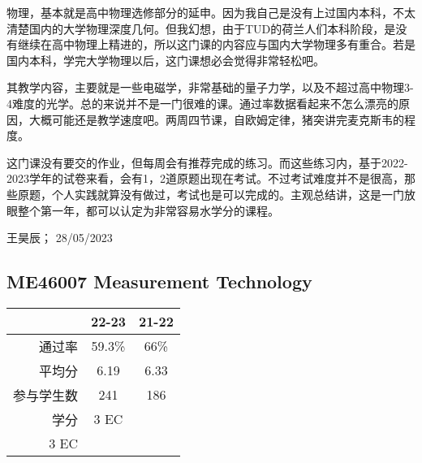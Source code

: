 物理，基本就是高中物理选修部分的延申。因为我自己是没有上过国内本科，不太清楚国内的大学物理深度几何。但我幻想，由于TUD的荷兰人们本科阶段，是没有继续在高中物理上精进的，所以这门课的内容应与国内大学物理多有重合。若是国内本科，学完大学物理以后，这门课想必会觉得非常轻松吧。

其教学内容，主要就是一些电磁学，非常基础的量子力学，以及不超过高中物理3-4难度的光学。总的来说并不是一门很难的课。通过率数据看起来不怎么漂亮的原因，大概可能还是教学速度吧。两周四节课，自欧姆定律，猪突讲完麦克斯韦的程度。

这门课没有要交的作业，但每周会有推荐完成的练习。而这些练习内，基于2022-2023学年的试卷来看，会有1，2道原题出现在考试。不过考试难度并不是很高，那些原题，个人实践就算没有做过，考试也是可以完成的。主观总结讲，这是一门放眼整个第一年，都可以认定为非常容易水学分的课程。
\begin{flushright}
王昊辰； 28/05/2023
\end{flushright}


\subsection{ME46007 Measurement Technology}
\begin{minipage}{0.45\textwidth}
\centering
{}
\end{minipage}%
\begin{minipage}{0.45\textwidth}
\raggedleft
\begin{tabular}{r|c|c}
\textbf{ } & \textbf{22-23} & \textbf{21-22} \\ \hline
通过率 & 59.3\% & 66\%\\ 
平均分 & 6.19 & 6.33\\ 
参与学生数 & 241 &186\\ 
学分 & 3 EC &\\3 EC
\end{tabular}
\end{minipage}\\

